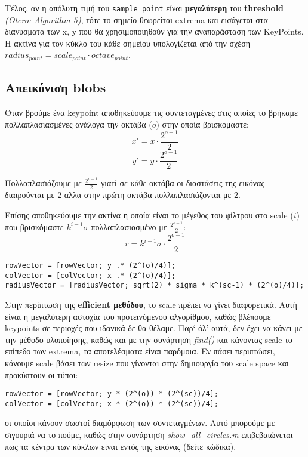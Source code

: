 \documentclass[11pt]{scrartcl} %
\begin{document}
Τέλος, αν η απόλυτη τιμή του \texttt{sample\_point} είναι \textbf{μεγαλύτερη} του \textbf{threshold} \textit{(Otero: Algorithm 5)}\cite{otero},
τότε το σημείο θεωρείται extrema και εισάγεται στα διανύσματα των x, y που θα χρησιμοποιηθούν για την αναπαράσταση των KeyPoints.
Η ακτίνα για τον κύκλο του κάθε σημείου υπολογίζεται από την σχέση $radius_{point} = scale_{point}\cdot octave_{point}$.
\subsection{Απεικόνιση blobs}

Όταν βρούμε ένα keypoint αποθηκεύουμε τις συντεταγμένες στις οποίες το βρήκαμε πολλαπλασιασμένες ανάλογα την οκτάβα ($ο$) στην οποία βρισκόμαστε:
\[x' = x \cdot \frac{2^{o-1}}{2}\]
\[y' = y \cdot \frac{2^{o-1}}{2}\]

Πολλαπλασιάζουμε με $\frac{2^{o-1}}{2}$ γιατί σε κάθε οκτάβα οι διαστάσεις της εικόνας διαιρούνται με 2 αλλα στην πρώτη οκτάβα πολλαπλασιάζονται με 2.

Επίσης αποθηκεύουμε την ακτίνα η οποία είναι το μέγεθος του φίλτρου στο scale ($i$) που βρισκόμαστε $k^{i-1} \sigma$
πολλαπλασιασμένο με $\frac{2^{o-1}}{2}$:
\[r = k^{i-1} \sigma \cdot \frac{2^{o-1}}{2}\]

\begin{verbatim}
rowVector = [rowVector; y .* (2^(o)/4)];
colVector = [colVector; x .* (2^(o)/4)];
radiusVector = [radiusVector; sqrt(2) * sigma * k^(sc-1) * (2^(o)/4)];
\end{verbatim}

Στην περίπτωση της \textbf{efficient μεθόδου}, το scale πρέπει να γίνει διαφορετικά.
Αυτή είναι η μεγαλύτερη αστοχία του προτεινόμενου αλγορίθμου, καθώς βλέπουμε keypoints
σε περιοχές που ιδανικά δε θα θέλαμε. Παρ` όλ' αυτά, δεν έχει να κάνει με την μέθοδο υλοποίησης,
καθώς και με την συνάρτηση \textit{find()} και κάνοντας scale το επίπεδο των extrema, τα αποτελέσματα
είναι παρόμοια. Εν πάσει περιπτώσει, κάνουμε scale βάσει των resize που γίνονται στην δημιουργία του
scale space και προκύπτουν οι τύποι:
\begin{verbatim}
rowVector = [rowVector; y * (2^(o)) * (2^(sc))/4];
colVector = [colVector; x * (2^(o)) * (2^(sc))/4];
\end{verbatim}
οι οποίοι κάνουν σωστοί διαμόρφωση των συντεταγμένων. Αυτό μπορούμε με σιγουριά να το πούμε, καθώς
στην συνάρτηση \textit{show\_all\_circles.m} επιβεβαιώνεται πως τα κέντρα των κύκλων είναι εντός της
εικόνας (δείτε κώδικα).
\end{document}
